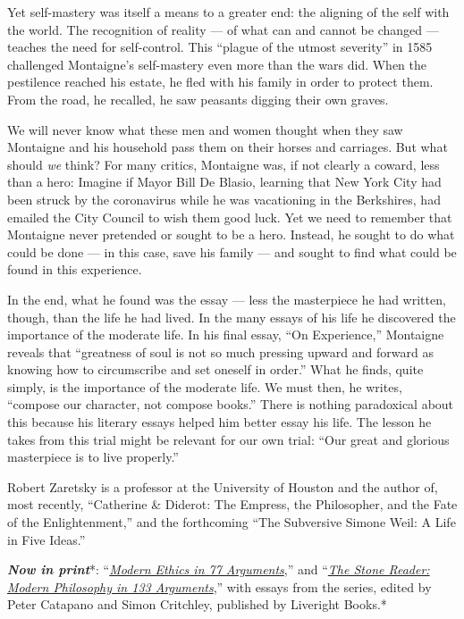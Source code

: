 Yet self-mastery was itself a means to a greater end: the aligning of
the self with the world. The recognition of reality --- of what can and
cannot be changed --- teaches the need for self-control. This ``plague
of the utmost severity'' in 1585 challenged Montaigne's self-mastery
even more than the wars did. When the pestilence reached his estate, he
fled with his family in order to protect them. From the road, he
recalled, he saw peasants digging their own graves.

We will never know what these men and women thought when they saw
Montaigne and his household pass them on their horses and carriages. But
what should \emph{we} think? For many critics, Montaigne was, if not
clearly a coward, less than a hero: Imagine if Mayor Bill De Blasio,
learning that New York City had been struck by the coronavirus while he
was vacationing in the Berkshires, had emailed the City Council to wish
them good luck. Yet we need to remember that Montaigne never pretended
or sought to be a hero. Instead, he sought to do what could be done ---
in this case, save his family --- and sought to find what could be found
in this experience.

In the end, what he found was the essay --- less the masterpiece he had
written, though, than the life he had lived. In the many essays of his
life he discovered the importance of the moderate life. In his final
essay, ``On Experience,'' Montaigne reveals that ``greatness of soul is
not so much pressing upward and forward as knowing how to circumscribe
and set oneself in order.'' What he finds, quite simply, is the
importance of the moderate life. We must then, he writes, ``compose our
character, not compose books.'' There is nothing paradoxical about this
because his literary essays helped him better essay his life. The lesson
he takes from this trial might be relevant for our own trial: ``Our
great and glorious masterpiece is to live properly.''

Robert Zaretsky is a professor at the University of Houston and the
author of, most recently, ``Catherine \& Diderot: The Empress, the
Philosopher, and the Fate of the Enlightenment,'' and the forthcoming
``The Subversive Simone Weil: A Life in Five Ideas.''

\emph{\textbf{Now in print}}*:
``\emph{\href{http://bitly.com/1MW2kN3}{\emph{Modern Ethics in 77
Arguments}}},'' and ``\emph{\href{http://bitly.com/1MW2kN3}{\emph{The
Stone Reader: Modern Philosophy in 133 Arguments}}},'' with essays from
the series, edited by Peter Catapano and Simon Critchley, published by
Liveright Books.*

